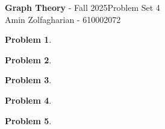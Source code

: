 \documentclass[12pt]{article}
\newcommand{\customanswer}[1]{%
\begin{problem}
\end{problem}

}
\newtheorem{problem}{Problem}
\begin{document}
\noindent \textbf{Graph Theory} - Fall 2025\hfill Problem Set 4\\
Amin Zolfagharian - 610002072

\hrulefill

\customanswer{1}
\customanswer{2}
\customanswer{3}
\customanswer{4}
\newpage
\customanswer{5}
\end{document}

